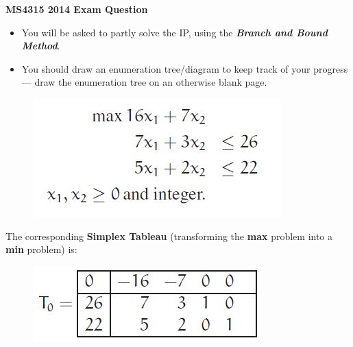 \documentclass{beamer}
\begin{document}
\begin{frame}
\large
\noindent \textbf{MS4315 2014 Exam Question}
\begin{itemize}
\item You will be asked to partly solve the IP, using the \textbf{\textit{Branch and Bound
Method}}. 
\item You should draw an enumeration tree/diagram to keep
track of your progress — draw the enumeration tree on an otherwise
blank page.
\end{itemize}
\end{frame}
\begin{frame}
\begin{figure}
	\centering
	\includegraphics[width=0.55\linewidth]{Exam14-Question}
	
\end{figure}
The corresponding \textbf{Simplex Tableau} (transforming the \textbf{max} problem into a
\textbf{min} problem) is:
\begin{figure}
\centering
\includegraphics[width=0.7\linewidth]{Exam14-a}
\end{figure}

\end{frame}
\end{document}
